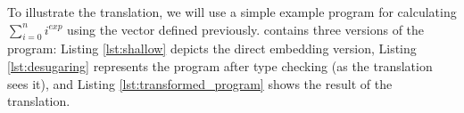 \documentclass[paper.tex]{subfiles}
\begin{document}
To illustrate the \tool translation, we will use a simple example program for calculating $\sum_{i=0}^n i^{exp}$ using the vector \edsl defined previously.%
%
%
 contains three versions of the program: Listing \ref{lst:shallow} depicts the direct embedding version, Listing \ref{lst:desugaring} represents the program after type checking (as the translation sees it), and Listing \ref{lst:transformed_program} shows the result of the translation.

\setlength\columnsep{4pt}
\end{document}

